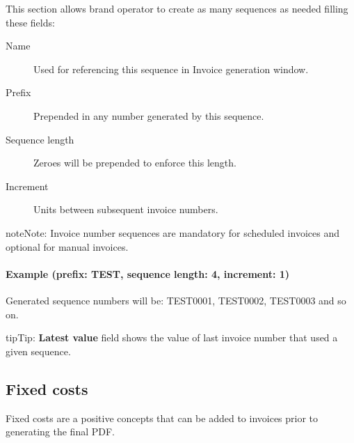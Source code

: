 \documentclass[letterpaper,10pt,english]{sphinxmanual}
\begin{document}
This section allows brand operator to create as many sequences as needed filling these fields:
\begin{description}
\item[{Name}] \leavevmode{}\label{administration_portal/brand/invoicing/invoice_number_sequences:term-name}
Used for referencing this sequence in Invoice generation window.

\item[{Prefix}] \leavevmode{}\label{administration_portal/brand/invoicing/invoice_number_sequences:term-prefix}
Prepended in any number generated by this sequence.

\item[{Sequence length}] \leavevmode{}\label{administration_portal/brand/invoicing/invoice_number_sequences:term-sequence-length}
Zeroes will be prepended to enforce this length.

\item[{Increment}] \leavevmode{}\label{administration_portal/brand/invoicing/invoice_number_sequences:term-increment}
Units between subsequent invoice numbers.

\end{description}

\begin{notice}{note}{Note:}
Invoice number sequences are mandatory for scheduled invoices and optional for manual invoices.
\end{notice}
\paragraph{Example (prefix: TEST, sequence length: 4, increment: 1)}

Generated sequence numbers will be: TEST0001, TEST0002, TEST0003 and so on.

\begin{notice}{tip}{Tip:}
\textbf{Latest value} field shows the value of last invoice number that used a given sequence.
\end{notice}


\subsection{Fixed costs}
\label{administration_portal/brand/invoicing/fixed_costs:fixed-costs}\label{administration_portal/brand/invoicing/fixed_costs::doc}
Fixed costs are a positive concepts that can be added to invoices prior to generating the final PDF.
\end{document}
